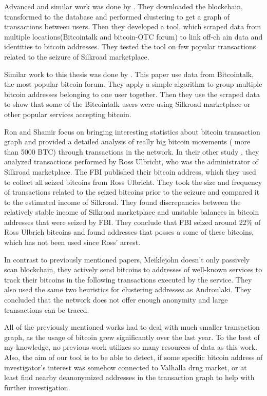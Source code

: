 \documentclass[
  digital, %
  table,   %
  lof,     %
  lot,     %
  oneside
]{fithesis3}
\begin{document}
Advanced and similar work was done by \parencite{spagnuolo2014bitiodine}. They downloaded the blockchain, transformed to
 the database
and performed clustering to get a graph of transactions between users.
Then they developed a tool, which scraped data from multiple locations(Bitcointalk and bitcoin-OTC forum) to link off-ch
ain data and identities to bitcoin addresses.
They tested the tool on few popular transactions related to the seizure of Silkroad marketplace.

Similar work to this thesis was done by \parencite{fleder2015bitcoin}.
This paper use data from Bitcointalk, the most popular bitcoin forum. 
They apply a simple algorithm to group multiple bitcoin addresses belonging to one user together.
Then they use the scraped data to show
that some of the Bitcointalk users were using Silkroad marketplace or other popular services accepting bitcoin.
 
Ron and Shamir \parencite{ron2013quantitative} focus on bringing
interesting statistics about bitcoin transaction graph
and provided a detailed analysis of really big bitcoin movements ( more than 5000 BTC) 
through transactions in the network.
In their other study \parencite{ron2014did}, they analyzed transactions performed by Ross Ulbricht,
who was the administrator of Silkroad marketplace.
The FBI published their bitcoin address, which they used to collect all seized bitcoins from Ross Ulbricht.
They took the size and frequency of transactions related to the seized bitcoins prior to the seizure and compared it to the estimated income of Silkroad. They found discrepancies between the
relatively stable income of Silkroad marketplace and unstable balances in bitcoin addresses
that were seized by FBI. They conclude that FBI seized around 22\% of Ross Ulbrich bitcoins
and found addresses that posses a some of these bitcoins, which has not been used since Ross' arrest.

In contrast to previously mentioned papers, Meiklejohn \parencite{meiklejohn2013fistful} 
doesn't only passively scan blockchain, they actively send bitcoins to addresses of
well-known services to track their bitcoins in the following transactions executed by the service.
They also used the same two heuristics for clustering addresses
as Androulaki. \parencite{androulaki2013evaluating}
They concluded that the network does not offer enough anonymity and large transactions can be traced.

All of the previously mentioned works had to deal with much smaller transaction graph,
as the usage of bitcoin grew significantly over the last year. 
To the best of my knowledge,
no previous work utilizes so many resources of data as this work.
Also, the aim of our tool is to be able to detect, if some specific bitcoin address of 
investigator's interest was somehow connected to Valhalla drug market, or at least find nearby
deanonymized addresses in the transaction graph to help with further investigation.
\end{document}
